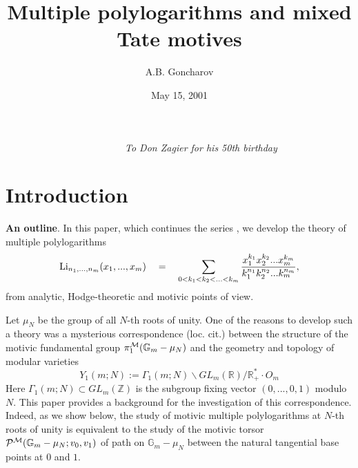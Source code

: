 \documentclass[10pt]{article}
\begin{document}
\newcommand{\Z}{{\mathbb Z}}
\newcommand{\R}{{\mathbb R}}
\newcommand{\Q}{{\mathbb Q}}
\newcommand{\C}{{\mathbb C}}
\newcommand{\lms}{\longmapsto}
\newcommand{\lra}{\longrightarrow}
\newcommand{\ra}{\rightarrow}

\begin{titlepage}
\title{Multiple  polylogarithms and mixed Tate motives }
\author{A.B. Goncharov }

\date{May 15, 2001}
\end{titlepage}
\maketitle


\vskip 3mm

{\it $\qquad$$\qquad$$\qquad$$\qquad$$\qquad$$\qquad$ To Don Zagier for his 50th birthday}

\vskip 5mm

\tableofcontents

\section  {Introduction}

{\bf An outline}. In this paper, which continues the series \cite{G0,G1,G2,G3,G4,G5},  we develop the theory of 
multiple polylogarithms 
\begin{equation} \label{zhe5}
{\rm Li}_{n_{1},...,n_{m}}(x_{1},...,x_{m})   
\quad = \quad 
\sum_{0 < k_{1} < k_{2} < ... < k_{m} } \frac{x_{1}^{k_{1}}x_{2}^{k_{2}}
... x_{m}^{k_{m}}}{k_{1}^{n_{1}}k_{2}^{n_{2}}...k_{m}^{n_{m}}},
\end{equation}
from 
 analytic, Hodge-theoretic and motivic points of view. 

Let $\mu_N$ be  the group of all $N$-th roots of unity. 
One of the reasons to develop such a theory was a mysterious correspondence (loc. cit.) 
between 
the 
 structure of the motivic fundamental group $\pi_1^{{\cal M}}({\mathbb G}_m - \mu_N)$ and 
the geometry and topology of modular varieties 
$$
Y_1(m;N):= \Gamma_1(m;N) \backslash GL_m(\R)/\R^*_+\cdot O_m 
$$  
Here $\Gamma_1(m;N) \subset GL_m(\Z)$ is the subgroup fixing  vector 
$(0, ..., 0, 1)$ modulo $N$. This paper  provides a background 
for the investigation of this correspondence. Indeed, as we show below, 
the study of 
motivic multiple polylogarithms at  $N$-th roots of unity is 
equivalent to the study of 
the motivic torsor ${\cal P}^{{\cal M}}({\mathbb G}_m - \mu_N; v_0, v_1)$ 
of path 
on ${\mathbb G}_m - \mu_N$ between the natural tangential base points at $0$ and $1$. 
\end{document}
